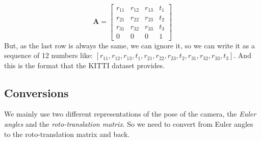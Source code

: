 \begin{equation}
    \textbf{A} = \begin{bmatrix}
                     r_{11} & r_{12} & r_{13} &t_{1}\\
                     r_{21} & r_{22} & r_{23} &t_{2}\\
                     r_{31} & r_{32} & r_{33} &t_{3}\\
                     0 & 0 & 0 & 1
    \end{bmatrix}
    \label{eq:roto-transformation}
\end{equation}
But, as the last row is always the same, we can ignore it, so we can write it as a sequence of 12 numbers like: $[r_{11}, r_{12}, r_{13}, t_{1}, r_{21}, r_{22}, r_{23}, t_{2}, r_{31}, r_{32}, r_{33}, t_{3}]$.
And this is the format that the KITTI dataset provides.

\subsection{Conversions}\label{subsec:conversions}
We mainly use two different representations of the pose of the camera, the \textit{Euler angles} and the \textit{roto-translation matrix}.
So we need to convert from Euler angles to the roto-translation matrix and back.

